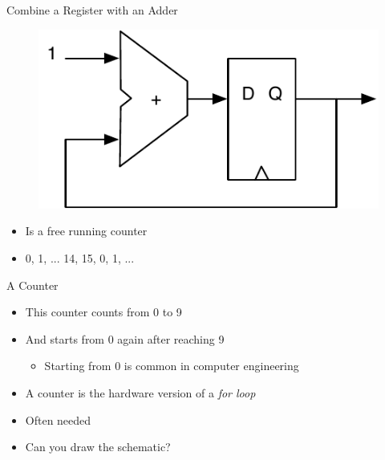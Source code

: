 \begin{frame}[fragile]{Combine a Register with an Adder}
\begin{figure}
  \includegraphics[scale=\scale]{../figures/counter}
\end{figure}
\begin{itemize}
\item Is a free running counter
\item 0, 1, ... 14, 15, 0, 1, ...
\end{itemize}
\end{frame}


\begin{frame}[fragile]{A Counter}
\begin{itemize}
\item This counter counts from 0 to 9
\item And starts from 0 again after reaching 9
\begin{itemize}
\item Starting from 0 is common in computer engineering
\end{itemize}
\item A counter is the hardware version of a \emph{for loop}
\item Often needed
\item Can you draw the schematic?
\end{itemize}
\end{frame}

